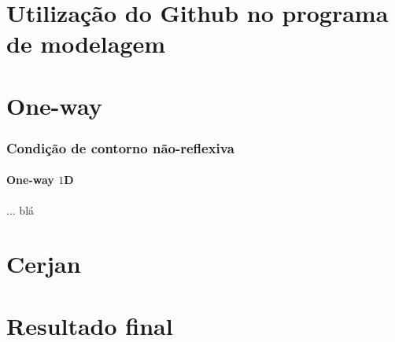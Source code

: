 \documentclass[10pt]{beamer} %
\begin{document}
\section{Utilização do Github no programa de modelagem}


\section{One-way}


\begin{frame}
	\frametitle{Condição de contorno não-reflexiva}
	\framesubtitle{One-way $1$D}
	\begin{block}{...}
		blá
	\end{block}		
\end{frame}

\section{Cerjan}

\section{Resultado final}


\end{document}

